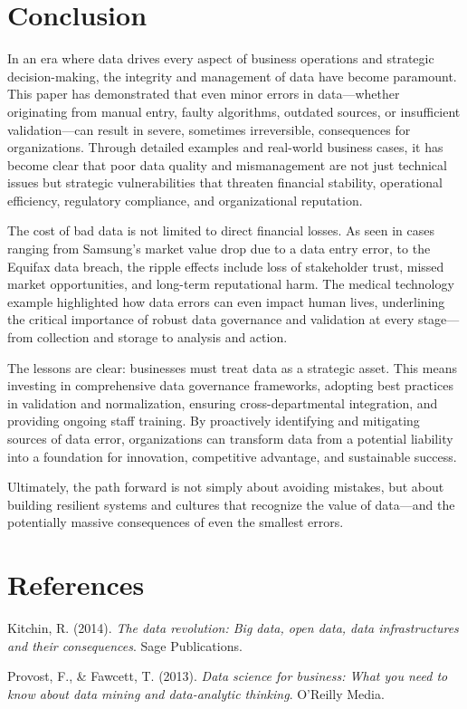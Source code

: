 \documentclass[
  man,
  floatsintext,
  longtable,
  nolmodern,
  notxfonts,
  notimes,
  colorlinks=true,linkcolor=blue,citecolor=blue,urlcolor=blue]{apa7}
\newlength{\cslhangindent}
\newenvironment{CSLReferences}[2] %
 {\begin{list}{}{%
  \setlength{\itemindent}{0pt}
  \setlength{\leftmargin}{0pt}
  \setlength{\parsep}{0pt}
  \ifodd #1
   \setlength{\leftmargin}{\cslhangindent}
   \setlength{\itemindent}{-1\cslhangindent}
  \fi
  \setlength{\itemsep}{#2\baselineskip}}}
 {\end{list}}
\begin{document}
\section{Conclusion}\label{conclusion}

In an era where data drives every aspect of business operations and
strategic decision-making, the integrity and management of data have
become paramount. This paper has demonstrated that even minor errors in
data---whether originating from manual entry, faulty algorithms,
outdated sources, or insufficient validation---can result in severe,
sometimes irreversible, consequences for organizations. Through detailed
examples and real-world business cases, it has become clear that poor
data quality and mismanagement are not just technical issues but
strategic vulnerabilities that threaten financial stability, operational
efficiency, regulatory compliance, and organizational reputation.

The cost of bad data is not limited to direct financial losses. As seen
in cases ranging from Samsung's market value drop due to a data entry
error, to the Equifax data breach, the ripple effects include loss of
stakeholder trust, missed market opportunities, and long-term
reputational harm. The medical technology example highlighted how data
errors can even impact human lives, underlining the critical importance
of robust data governance and validation at every stage---from
collection and storage to analysis and action.

The lessons are clear: businesses must treat data as a strategic asset.
This means investing in comprehensive data governance frameworks,
adopting best practices in validation and normalization, ensuring
cross-departmental integration, and providing ongoing staff training. By
proactively identifying and mitigating sources of data error,
organizations can transform data from a potential liability into a
foundation for innovation, competitive advantage, and sustainable
success.

Ultimately, the path forward is not simply about avoiding mistakes, but
about building resilient systems and cultures that recognize the value
of data---and the potentially massive consequences of even the smallest
errors.

\section{References}\label{references}

\label{refs}
\begin{CSLReferences}{1}{0}
Kitchin, R. (2014). \emph{The data revolution: Big data, open data, data
infrastructures and their consequences}. Sage Publications.

Provost, F., \& Fawcett, T. (2013). \emph{Data science for business:
What you need to know about data mining and data-analytic thinking}.
O'Reilly Media.

\end{CSLReferences}
\end{document}
